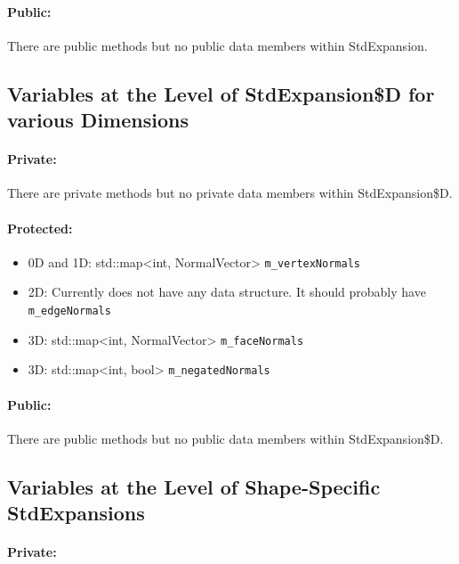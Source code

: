 \paragraph{Public:}

There are public methods but no public data members within StdExpansion.



\subsection{Variables at the Level of StdExpansion\$D for various Dimensions}

\paragraph{Private:}

There are private methods but no private data members within StdExpansion\$D.

\paragraph{Protected:}


\begin{itemize}
\item 0D and 1D: std::map<int, NormalVector> \verb+m_vertexNormals+
%
\item 2D: Currently does not have any data structure.  It should probably have \verb+m_edgeNormals+
%
\item 3D: std::map<int, NormalVector> \verb+m_faceNormals+
%
\item 3D: std::map<int, bool> \verb+m_negatedNormals+
\end{itemize}

\paragraph{Public:}

There are public methods but no public data members within StdExpansion\$D.

\subsection{Variables at the Level of Shape-Specific StdExpansions}

\paragraph{Private:}

